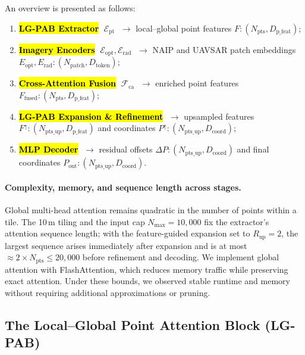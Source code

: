 \documentclass[remotesensing,article,accept,pdftex,moreauthors]{Definitions/mdpi}
\begin{document}
An overview is presented as follows:

\begin{enumerate}[leftmargin=*]
\item \textbf{\hl{LG-PAB Extractor} %
} $\;\mathcal{E}_{\mathrm{pt}}$
      $\;\rightarrow$ local–global point features $F: (N_{\text{pts}}, D_{\text{p\_feat}})$;
\item \textbf{\hl{Imagery Encoders}} $\;\mathcal{E}_{\mathrm{opt}},\mathcal{E}_{\mathrm{rad}}$
      $\;\rightarrow$ NAIP and UAVSAR patch embeddings $E_{\text{opt}}, E_{\text{rad}}: (N_{\text{patch}}, D_{\text{token}})$;
\item \textbf{\hl{Cross-Attention Fusion}} $\;\mathcal{F}_{\mathrm{ca}}$
      $\;\rightarrow$ enriched point features $F_{\!\mathrm{fused}}: (N_{\text{pts}}, D_{\text{p\_feat}})$;
\item \textbf{\hl{LG-PAB Expansion \& Refinement}}
      $\;\rightarrow$ upsampled features $F^{\uparrow}: (N_{\text{pts\_up}}, D_{\text{p\_feat}})$ and coordinates $P^{\uparrow}: (N_{\text{pts\_up}}, D_{\text{coord}})$;
\item \textbf{\hl{MLP Decoder}} $\;\rightarrow$ residual offsets $\Delta P: (N_{\text{pts\_up}}, D_{\text{coord}})$ and final coordinates $P_{\mathrm{out}}: (N_{\text{pts\_up}}, D_{\text{coord}})$.
\end{enumerate}


\paragraph{Complexity, memory, and sequence length across stages.}
Global multi-head attention remains quadratic in the number of points within a tile. The 10\,m tiling and the input cap $N_{\max}=10{,}000$ fix the extractor’s attention sequence length; with the feature-guided expansion set to $R_{\text{up}}=2$, the largest sequence arises immediately after expansion and is at most $\approx 2\times N_{\text{pts}} \le 20{,}000$ before refinement and decoding. We implement global attention with FlashAttention, which reduces memory traffic while preserving exact attention. Under these bounds, we observed stable runtime and memory without requiring additional approximations or pruning.

\subsection{The Local–Global Point Attention Block (LG-PAB)}
\label{sec:lgpab}
\end{document}
